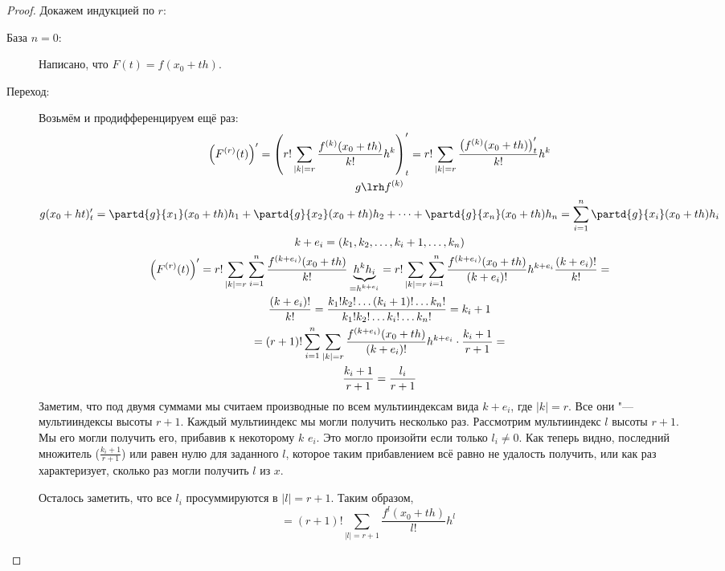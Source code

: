 \begin{proof}
	Докажем индукцией по $r$:
	\begin{description}
	\item[База $n = 0$:]
		Написано, что $F(t) = f(x_0 + th)$.
	\item[Переход:]
		Возьмём и продифференцируем ещё раз:
		\begin{gather*}
			\left(F^{(r)}(t)\right)' = \left(r! \sum_{|k| = r} \frac{f^{(k)}(x_0 + th)}{k!} h^k\right)'_t
				= r! \sum_{|k| = r} \frac{\left(f^{(k)}(x_0 + th)\right)'_t}{k!} h^k \\
			g \lrh f^{(k)} \\
			g(x_0+ht)'_t = \partd{g}{x_1}(x_0+th)h_1 + \partd{g}{x_2}(x_0+th)h_2 + \dots + \partd{g}{x_n}(x_0+th)h_n
				= \sum_{i=1}^n \partd{g}{x_i}(x_0+th) h_i \\
			k + e_i = (k_1, k_2, \dots, k_i + 1, \dots, k_n) \\
			\left(F^{(r)}(t)\right)' = r! \sum_{|k|=r} \sum_{i=1}^n \frac{f^{(k + e_i)} (x_0 + th)}{k!} \underbrace{h^k h_i}_{=h^{k + e_i}}
				= r! \sum_{|k|=r} \sum_{i=1}^n \frac{f^{(k + e_i)} (x_0 + th)}{(k+e_i)!} h^{k + e_i} \frac{(k+e_i)!}{k!} = \\
			\frac{(k+e_i)!}{k!} = \frac{k_1! k_2! \dots (k_i + 1)! \dots k_n!}{k_1! k_2! \dots k_i! \dots k_n!} = k_i + 1\\
			= (r+1)! \sum_{i=1}^n \sum_{|k|=r} \frac{f^{(k + e_i)} (x_0 + th)}{(k+e_i)!} h^{k + e_i} \cdot \frac{k_i + 1}{r + 1} = \\
			\frac{k_i + 1}{r + 1} = \frac{l_i}{r + 1}
		\end{gather*}
		Заметим, что под двумя суммами мы считаем производные по всем мультииндексам вида $k + e_i$, где $|k| = r$.
		Все они "--- мультииндексы высоты $r + 1$.
		Каждый мультииндекс мы могли получить несколько раз.
		Рассмотрим мультииндекс $l$ высоты $r + 1$.
		Мы его могли получить его, прибавив к некоторому $k$ $e_i$.
		Это могло произойти если только $l_i \ne 0$.
		Как теперь видно, последний множитель ($\frac{k_i + 1}{r + 1}$) или равен нулю для заданного $l$,
		которое таким прибавлением всё равно не удалость получить, или как раз характеризует, сколько раз могли получить $l$ из $x$.

		Осталось заметить, что все $l_i$ просуммируются в $|l| = r + 1$.
		Таким образом,
		\[ = (r+1)! \sum_{|l|=r + 1} \frac{f^{l} (x_0 + th)}{l!} h^l \]
	\end{description}
\end{proof}
